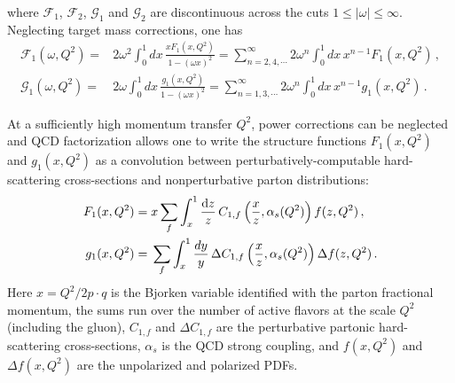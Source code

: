 where $\mathcal{F}_1$, $\mathcal{F}_2$, $\mathcal{G}_1$ and $\mathcal{G}_2$
are discontinuous across the cuts $1\leq |\omega| \leq \infty$.
%
Neglecting target mass corrections, one has
\begin{align}
\mathcal{F}_1(\omega,Q^2) 
= {} & 2 \omega^2 \int_0^1 dx\,  \frac{xF_1(x,Q^2)}{1-(\omega x)^2} 
= \sum_{n=2,4,\cdots}^\infty 2\omega^n \int_0^1 dx\, x^{n-1} F_1(x,Q^2) \,, \\
\mathcal{G}_1(\omega,Q^2) 
= {} & 2 \omega \int_0^1 dx\, \frac{g_1(x,Q^2)}{1-(\omega x)^2} 
= \sum_{n=1,3,\cdots}^\infty 2\omega^n \int_0^1 dx\, x^{n-1} g_1(x,Q^2)\,.
\end{align}

At a sufficiently high momentum transfer $Q^2$, power corrections can be 
neglected and QCD factorization allows one to write the structure functions 
$F_1(x,Q^2)$ and $g_1(x,Q^2)$ as a convolution between perturbatively-computable
hard-scattering cross-sections and nonperturbative parton distributions:
\begin{align}
F_1(x,Q^2) 
= {} 
& x\sum_f \int_x^1 \frac{{\rm d}z}{z}\,C_{1,f}\left(\frac{x}{z},\alpha_s(Q^2)\right)f(z,Q^2) \,, \label{eq:Fi}\\
g_1(x,Q^2) 
= {} 
& \sum_f \int_x^1\frac{dy}{y}\, \Delta C_{1,f}\left(\frac{x}{z},\alpha_s(Q^2)\right) \Delta f(z,Q^2) \,.
\label{pdf}
\end{align}
%
Here $x=Q^2/2p\cdot q$ is the Bjorken variable identified with the parton
fractional momentum, the sums run over the number of active
flavors at the scale $Q^2$ (including the gluon), $C_{1,f}$ and 
$\Delta C_{1,f}$ are the perturbative partonic hard-scattering cross-sections,
$\alpha_s$ is the QCD strong coupling, and $f(x,Q^2)$ and $\Delta f(x,Q^2)$ 
are the unpolarized and polarized PDFs.

